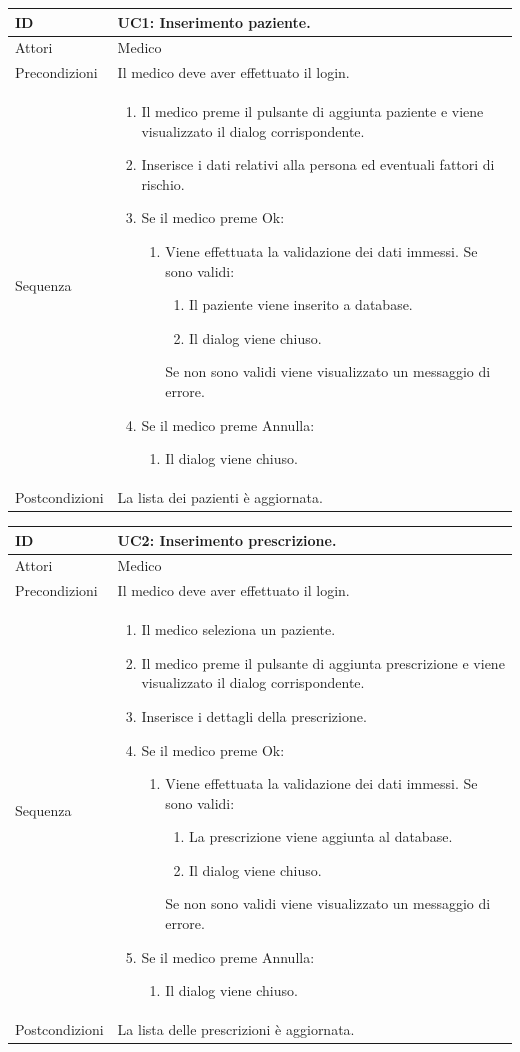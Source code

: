 \documentclass[a4paper, 11pt]{article}
\newcommand{\usecase}[5]{%
\begin{table}[H]
	\centering
	\renewcommand{\familydefault}{\ttdefault}\normalfont
\begin{tabular}{| >{\fontseries{b}\selectfont} p{0.2\textwidth} | L |}
	\hline
	ID&{#1}\\\hline
	Attori&{#2}\\\hline
	Precondizioni&{#3}\\\hline
	Sequenza&{#4}\\\hline
	Postcondizioni&{#5}\\\hline
\end{tabular}
\end{table}

}
\begin{document}
\usecase{UC1: Inserimento paziente.}
{Medico}
{Il medico deve aver effettuato il login.}
{%
	\begin{enumerate}[label*=\arabic*., nosep]
		\item Il medico preme il pulsante di aggiunta paziente e viene visualizzato il dialog corrispondente.
		\item Inserisce i dati relativi alla persona ed eventuali fattori di rischio.
		\item Se il medico preme Ok:
		\begin{enumerate}[label*=\arabic*., nosep]
			\item Viene effettuata la validazione dei dati immessi. Se sono validi:
			\begin{enumerate}[label*=\arabic*., nosep]
				\item Il paziente viene inserito a database.
				\item Il dialog viene chiuso.
			\end{enumerate}
			Se non sono validi viene visualizzato un messaggio di errore.
		\end{enumerate}
		\item Se il medico preme Annulla:
		\begin{enumerate}[label*=\arabic*., nosep]
			\item Il dialog viene chiuso.
		\end{enumerate}
	\end{enumerate}}
{La lista dei pazienti è aggiornata.}

\usecase{UC2: Inserimento prescrizione.}
{Medico}
{Il medico deve aver effettuato il login.}
{%
	\begin{enumerate}[label*=\arabic*., nosep]
		\item Il medico seleziona un paziente.
		\item Il medico preme il pulsante di aggiunta prescrizione e viene visualizzato il dialog corrispondente.
		\item Inserisce i dettagli della prescrizione.
		\item Se il medico preme Ok:
		\begin{enumerate}[label*=\arabic*., nosep]
			\item Viene effettuata la validazione dei dati immessi. Se sono validi:
			\begin{enumerate}[label*=\arabic*., nosep]
				\item La prescrizione viene aggiunta al database.
				\item Il dialog viene chiuso.
			\end{enumerate}
			Se non sono validi viene visualizzato un messaggio di errore.
		\end{enumerate}
		\item Se il medico preme Annulla:
		\begin{enumerate}[label*=\arabic*., nosep]
			\item Il dialog viene chiuso.
		\end{enumerate}
\end{enumerate}}
{La lista delle prescrizioni è aggiornata.}
\end{document}
